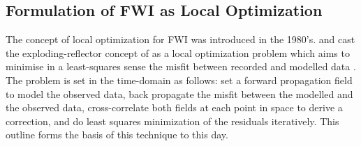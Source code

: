 

\subsection[FWI as Local Optimization]{Formulation of FWI as Local Optimization}\label{sec:fwi_local_opt}
The concept of local optimization for \ac{FWI} was introduced in the 1980’s. \citet{Lailly1983} and \citet{Tarantola1984a} cast the exploding-reflector concept of \citet{Claerbout1971, Claerbout1976} as a local optimization problem which aims to minimise in a least-squares sense the misfit between recorded and modelled data \citep{Virieux2009}. The problem is set in the time-domain as follows: set a forward propagation field to model the observed data, back propagate the misfit between the modelled and the observed data, cross-correlate both fields at each point in space to derive a correction, and do least squares minimization of the residuals iteratively. This outline forms the basis of this technique to this day.

